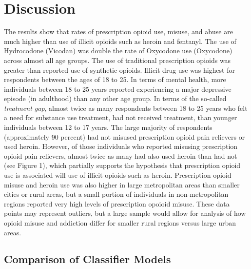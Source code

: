 \documentclass[sigconf]{acmart}
\begin{document}
\section{Discussion}

The results show that rates of prescription opioid use, misuse, and abuse are
much higher than use of illicit opioids such as heroin and fentanyl. The use 
of Hydrocodone (Vicodan) was double the rate of Oxycodone use (Oxycodone) 
across almost all age groups. The use of traditional prescription opioids 
was greater than reported use of synthetic opioids. Illicit drug use was 
highest for respondents between the ages of 18 to 25. In terms of mental 
health, more individuals between 18 to 25 years reported experiencing a major 
depressive episode (in adulthood) than any other age group. In terms of the 
so-called \emph{treatment gap}, almost twice as many respondents between 
18 to 25 years who felt a need for substance use treatment, had not received
treatment, than younger individuals between 12 to 17 years. The large majority 
of respondents (approximately 90 percent) had not misused prescription opioid 
pain relievers or used heroin. However, of those individuals who reported 
misusing prescription opioid pain relievers, almost twice as many had also
used heroin than had not (see Figure 1), which partially supports the 
hypothesis that prescription opioid use is associated will use of illicit 
opioids such as heroin. Prescription opioid misuse and heroin use was also
higher in large metropolitan areas than smaller cities or rural areas, but
a small portion of individuals in non-metropolitan regions reported very
high levels of prescription opoioid misuse. These data points may represent 
outliers, but a large sample would allow for analysis of how opioid misuse 
and addiction differ for smaller rural regions versus large urban areas. 

\subsection{Comparison of Classifier Models}
\end{document}
